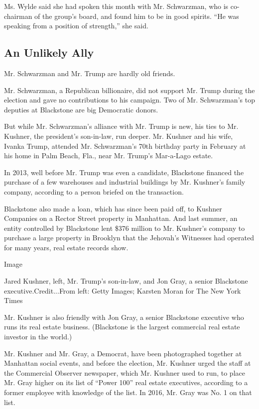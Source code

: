 Ms. Wylde said she had spoken this month with Mr. Schwarzman, who is
co-chairman of the group's board, and found him to be in good spirits.
``He was speaking from a position of strength,'' she said.

\hypertarget{an-unlikely-ally}{%
\subsection{An Unlikely Ally}\label{an-unlikely-ally}}

Mr. Schwarzman and Mr. Trump are hardly old friends.

Mr. Schwarzman, a Republican billionaire, did not support Mr. Trump
during the election and gave no contributions to his campaign. Two of
Mr. Schwarzman's top deputies at Blackstone are big Democratic donors.

But while Mr. Schwarzman's alliance with Mr. Trump is new, his ties to
Mr. Kushner, the president's son-in-law, run deeper. Mr. Kushner and his
wife, Ivanka Trump, attended Mr. Schwarzman's 70th birthday party in
February at his home in Palm Beach, Fla., near Mr. Trump's Mar-a-Lago
estate.

In 2013, well before Mr. Trump was even a candidate, Blackstone financed
the purchase of a few warehouses and industrial buildings by Mr.
Kushner's family company, according to a person briefed on the
transaction.

Blackstone also made a loan, which has since been paid off, to Kushner
Companies on a Rector Street property in Manhattan. And last summer, an
entity controlled by Blackstone lent \$376 million to Mr. Kushner's
company to purchase a large property in Brooklyn that the Jehovah's
Witnesses had operated for many years, real estate records show.

Image

Jared Kushner, left, Mr. Trump's son-in-law, and Jon Gray, a senior
Blackstone executive.Credit...From left: Getty Images; Karsten Moran for
The New York Times

Mr. Kushner is also friendly with Jon Gray, a senior Blackstone
executive who runs its real estate business. (Blackstone is the largest
commercial real estate investor in the world.)

Mr. Kushner and Mr. Gray, a Democrat, have been photographed together at
Manhattan social events, and before the election, Mr. Kushner urged the
staff at the Commercial Observer newspaper, which Mr. Kushner used to
run, to place Mr. Gray higher on its list of ``Power 100'' real estate
executives, according to a former employee with knowledge of the list.
In 2016, Mr. Gray was No. 1 on that list.

